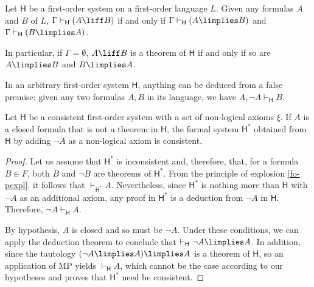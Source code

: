\begin{proposition}
\label{foiff}
Let $\mathsf{H}$ be a first-order system on a first-order language $L$. Given any formulas $A$ and $B$ of $L$, $\Gamma \vdash_{\mathsf{H}} (A \liff B)$ if and only if $\Gamma \vdash_\mathsf{H} (A\limplies B)$ and $\Gamma \vdash_\mathsf{H} (B\limplies A)$.

In particular, if $\Gamma = \emptyset$, $A\liff B$ is a theorem of $\mathsf{H}$ if and only if so are $A\limplies B$ and $B\limplies A$.
\end{proposition}

\begin{proposition}
In an arbitrary first-order system $\mathsf{H}$, anything can be deduced from a false premise: given any two formulas $A,B$ in its language, we have $A,\lnot A \vdash_{\mathsf{H}} B$. 
\label{fo-pexpl}
\end{proposition}

\begin{lemma}
Let $\mathsf{H}$ be a consistent first-order system with a set of non-logical axioms $\xi$.
If $A$ is a closed formula that is not a theorem in $\mathsf{H}$, the formal system $\mathsf{H}^*$ obtained from $\mathsf{H}$ by adding $\lnot A$ as a non-logical axiom is consistent.
\label{notacons}
\end{lemma}

\begin{proof}
Let us assume that $\mathsf{H}^*$ is inconsistent and, therefore, that, for a formula $B\in F$, both $B$ and $\lnot B$ are theorems of $\mathsf{H}^*$.
From the principle of explosion \ref{fo-pexpl}, it follows that $\vdash_{\mathsf{H}^*} A$.
Nevertheless, since $\mathsf{H}^*$ is nothing more than $\mathsf{H}$ with $\lnot A$ as an additional axiom, any proof in $\mathsf{H}^*$ is a deduction from $\lnot A$ in $\mathsf{H}$.
Therefore, $\lnot A \vdash_\mathsf{H} A$.

By hypothesis, $A$ is closed and so must be $\lnot A$. Under these conditions, we can apply the deduction theorem to conclude that $\vdash_{\mathsf{H}} \lnot A \limplies A$. In addition, since the tautology $(\lnot A \limplies A)\limplies A$ is a theorem of $\mathsf{H}$, so an application of MP yields $\vdash_{\mathsf{H}} A$, which cannot be the case according to our hypotheses and proves that $\mathsf{H}^*$ need be consistent.
\end{proof}


